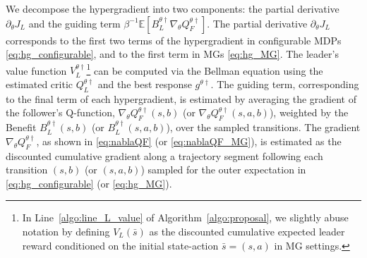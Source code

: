 \documentclass[letterpaper]{article} %
\providecommand{\E}{\mathbb{E}} %
\begin{document}
We decompose the hypergradient into two components: the partial derivative $\partial_{\theta}J_L$ and the guiding term $\beta^{-1}\E[B_L^{\theta\dagger}\nabla_{\theta}Q_F^{\theta\dagger}]$.
The partial derivative $\partial_{\theta}J_L$ corresponds to the first two terms of the hypergradient in configurable MDPs \eqref{eq:hg_configurable}, and to the first term in MGs \eqref{eq:hg_MG}.
The leader's value function $V_L^{\theta\dagger}$\footnote{
In Line~\ref{algo:line_L_value} of Algorithm~\ref{algo:proposal}, we slightly abuse notation by defining $V_L(\bar{s})$ as the discounted cumulative expected leader reward conditioned on the initial state-action $\bar{s}=(s,a)$ in MG settings.
} can be computed via the Bellman equation using the estimated critic $Q_L^{\theta\dagger}$ and the best response $g^{\theta\dagger}$.
%
The guiding term, corresponding to the final term of each hypergradient, is estimated by averaging the gradient of the follower's Q-function, $\nabla_{\theta}Q_F^{\theta\dagger}(s,b)$ (or $\nabla_{\theta}Q_F^{\theta\dagger}(s,a,b)$), weighted by the Benefit $B_L^{\theta\dagger}(s,b)$ (or $B_L^{\theta\dagger}(s,a,b)$), over the sampled transitions. 
The gradient $\nabla_{\theta}Q_F^{\theta\dagger}$, as shown in \eqref{eq:nablaQF} (or \eqref{eq:nablaQF_MG}), is estimated as the discounted cumulative gradient along a trajectory segment following each transition $(s,b)$ (or $(s,a,b)$) sampled for the outer expectation in \eqref{eq:hg_configurable} (or \eqref{eq:hg_MG}).
\end{document}
